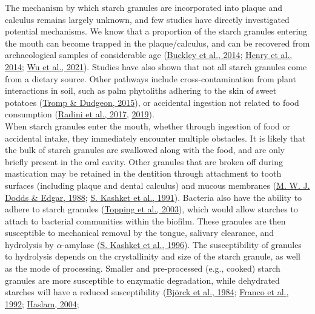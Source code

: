 \documentclass[
  letterpaper,
]{book}
\begin{document}
The mechanism by which starch granules are incorporated into plaque and
calculus remains largely unknown, and few studies have directly
investigated potential mechanisms. We know that a proportion of the
starch granules entering the mouth can become trapped in the
plaque/calculus, and can be recovered from archaeological samples of
considerable age
(\protect\hyperlink{ref-buckleyDentalCalculus2014}{Buckley et al.,
2014}; \protect\hyperlink{ref-henryNeanderthalCalculus2014}{Henry et
al., 2014}; \protect\hyperlink{ref-wuDietEarliest2021}{Wu et al.,
2021}). Studies have also shown that not all starch granules come from a
dietary source. Other pathways include cross-contamination from plant
interactions in soil, such as palm phytoliths adhering to the skin of
sweet potatoes (\protect\hyperlink{ref-trompDietaryNondietary2015}{Tromp
\& Dudgeon, 2015}), or accidental ingestion not related to food
consumption (\protect\hyperlink{ref-radiniFoodPathways2017}{Radini et
al., 2017}, \protect\hyperlink{ref-radiniMedievalWomen2019}{2019}).\\
When starch granules enter the mouth, whether through ingestion of food
or accidental intake, they immediately encounter multiple obstacles. It
is likely that the bulk of starch granules are swallowed along with the
food, and are only briefly present in the oral cavity. Other granules
that are broken off during mastication may be retained in the dentition
through attachment to tooth surfaces (including plaque and dental
calculus) and mucous membranes
(\protect\hyperlink{ref-doddsCarbohydrateRetention1988}{M. W. J. Dodds
\& Edgar, 1988}; \protect\hyperlink{ref-kashketFoodRetention1991}{S.
Kashket et al., 1991}). Bacteria also have the ability to adhere to
starch granules
(\protect\hyperlink{ref-toppingResistantStarch2003}{Topping et al.,
2003}), which would allow starches to attach to bacterial communities
within the biofilm. These granules are then susceptible to mechanical
removal by the tongue, salivary clearance, and hydrolysis by
\(\alpha\)-amylase (\protect\hyperlink{ref-kashketFoodParticles1996}{S.
Kashket et al., 1996}). The susceptibility of granules to hydrolysis
depends on the crystallinity and size of the starch granule, as well as
the mode of processing. Smaller and pre-processed (e.g., cooked) starch
granules are more susceptible to enzymatic degradation, while dehydrated
starches will have a reduced susceptibility
(\protect\hyperlink{ref-bjorckStarchProcessing1984}{Björck et al.,
1984}; \protect\hyperlink{ref-francoStarchDegradation1992}{Franco et
al., 1992};
\protect\hyperlink{ref-haslamDecompositionStarch2004}{Haslam, 2004};
\end{document}
